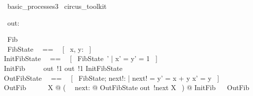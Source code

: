 
\begin{zsection}
  \SECTION\ basic\_processes3 \parents\ circus\_toolkit
\end{zsection}

\begin{circus}
    \circchannel\ out: \nat
\end{circus}

\begin{circus}
    \circprocess\ Fib ~~\circdef~~ \circbegin \\
    \circstate\ FibState ~~==~~ [~ x, y: \nat ~] \\
    InitFibState ~~==~~ [~ FibState~' | x' = y' = 1 ~] \\
    InitFib ~~\circdef~~ out~!1 \then out~!1 \then InitFibState \\
    OutFibState ~~==~~ [~ \Delta FibState; next!: \nat | next! = y' = x + y \land x' = y ~] \\
    OutFib ~~\circdef~~ \circmu\ X @ (~ \circvar\ next: \nat @ OutFibState \circseq out~!next \then X ~)
    @ InitFib ~\circseq~ OutFib \\
    \circend
\end{circus}

